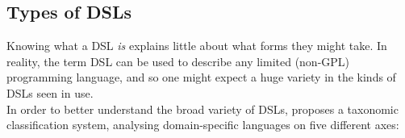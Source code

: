 \documentclass[a4paper,11pt]{report}
\begin{document}

\subsection{Types of DSLs} %
\label{sub:types_of_dsls}
Knowing what a DSL \textit{is} explains little about what forms they might take. 
In reality, the term DSL can be used to describe any limited (non-GPL) programming language, and so one might expect a huge variety in the kinds of DSLs seen in use. \\

In order to better understand the broad variety of DSLs, \citet{van2000domain} proposes a taxonomic classification system, analysing domain-specific languages on five different axes:
\end{document}
